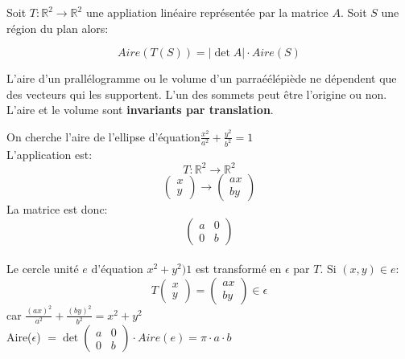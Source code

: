 \begin{theorem}
    Soit $T : \mathbb{R}^2 \to \mathbb{R}^2$  une appliation linéaire représentée par la matrice $A$. Soit $S$ une région du plan alors:
\begin{formule}
    \[Aire(T(S)) = |\det A| \cdot Aire(S)\]
\end{formule}
\end{theorem}
\begin{framedremark}
    L'aire d'un prallélogramme ou le volume d'un parraéélépiède ne dépendent que des vecteurs qui les supportent. L'un des sommets peut être l'origine ou non. L'aire et le volume sont \textbf{invariants par translation}.
\end{framedremark}
\begin{exemple}
    On cherche l'aire de l'ellipse d'équation$\frac{x^2}{a^2} + \frac{y^2}{b^2} = 1$
    \\
    L'application est:
    \[T: \mathbb{R}^2 \to \mathbb{R}^2 \]
    \[\begin{pmatrix}
        x \\ y
    \end{pmatrix} \to \begin{pmatrix}
        ax \\ by
    \end{pmatrix}\]
    La matrice est donc: 
    \[\begin{pmatrix}
        a & 0\\ 0 & b
    \end{pmatrix}\]
    \\
    Le cercle unité $e$ d'équation $x^2 + y^2 ) 1$ est transformé en $\epsilon$ par $T$. Si $(x, y) \in e$:
    \[T\begin{pmatrix}
        x \\ y
    \end{pmatrix} = \begin{pmatrix}
        ax \\ by
    \end{pmatrix} \in \epsilon\] car $\frac{(ax)^2}{a^2} + \frac{(by)^2}{b^2} = x^2 + y^2$
    \\
    Aire($\epsilon$) $= \det \begin{pmatrix}
        a & 0 \\ 0 & b
    \end{pmatrix} \cdot Aire(e) = \pi\cdot a \cdot b$
\end{exemple}




